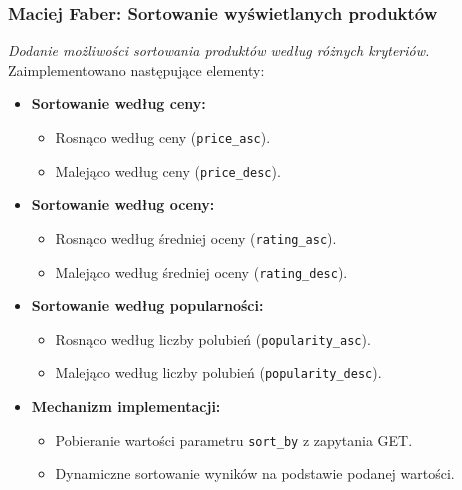 \documentclass[12pt,a4paper,oneside]{article}
\theoremstyle{definition}
\numberwithin{equation}{section}
\begin{document}
\subsubsection{Maciej Faber: Sortowanie wyświetlanych produktów}
\label{section:1.3.44}
\textit{
Dodanie możliwości sortowania produktów według różnych kryteriów.
}
Zaimplementowano następujące elementy:
\begin{itemize}
    \item \textbf{Sortowanie według ceny:}
    \begin{itemize}
        \item Rosnąco według ceny (\texttt{price\_asc}).
        \item Malejąco według ceny (\texttt{price\_desc}).
    \end{itemize}
    \item \textbf{Sortowanie według oceny:}
    \begin{itemize}
        \item Rosnąco według średniej oceny (\texttt{rating\_asc}).
        \item Malejąco według średniej oceny (\texttt{rating\_desc}).
    \end{itemize}
    \item \textbf{Sortowanie według popularności:}
    \begin{itemize}
        \item Rosnąco według liczby polubień (\texttt{popularity\_asc}).
        \item Malejąco według liczby polubień (\texttt{popularity\_desc}).
    \end{itemize}
    \item \textbf{Mechanizm implementacji:}
    \begin{itemize}
        \item Pobieranie wartości parametru \texttt{sort\_by} z zapytania GET.
        \item Dynamiczne sortowanie wyników na podstawie podanej wartości.
    \end{itemize}
\end{itemize}
\end{document}
